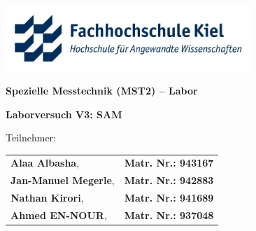 \documentclass[12pt,a4paper,ngerman,captions=tableheading]{scrartcl}
\begin{document}

\begin{titlepage}
\centering
\begin{onehalfspace}
    \huge \textbf{}  
    \linebreak \large \textbf{}
\end{onehalfspace}


\includegraphics[height=70pt]{Bilder/fhkiel_logo.jpg}

\vspace{0.6cm}

\begin{onehalfspace}
    \huge \textbf{Spezielle Messtechnik (MST2) – Labor}  \linebreak \large \textbf{}
\end{onehalfspace}

\vspace{0.3cm}

\begin{onehalfspace}
    \Large \textbf{Laborversuch V3: SAM}
\end{onehalfspace}

\vspace{1cm}
{\large Teilnehmer:} 
    \vspace{0.5cm}

    \begin{tabular}{l l}
        \large\textbf{Alaa Albasha}, & \textbf{Matr. Nr.: 943167} \\
        \large\textbf{Jan-Manuel Megerle}, & \textbf{Matr. Nr.: 942883} \\
        \large\textbf{Nathan Kirori}, & \textbf{Matr. Nr.: 941689} \\
        \large\textbf{Ahmed EN-NOUR}, & \textbf{Matr. Nr.: 937048} \\
    \end{tabular}



\end{titlepage}
\end{document}
